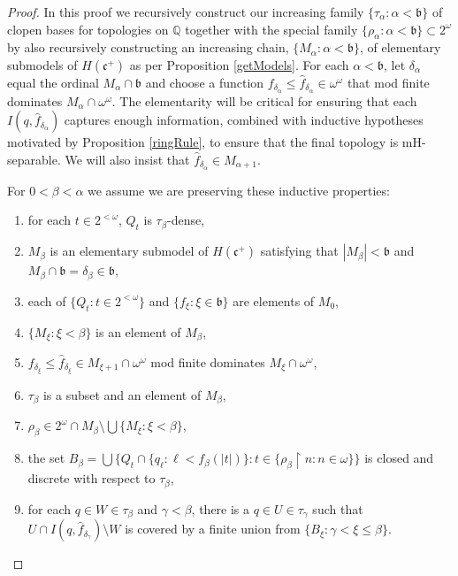 \documentclass{amsart}
\theoremstyle{definition}
\theoremstyle{remark}
\begin{document}
\begin{proof}
In this proof we recursively  construct
our  increasing family $\{ \tau_\alpha : \alpha < \mathfrak b\}$
of clopen bases for topologies on $\mathbb Q$ together with 
the special  family
 $\{ \rho_\alpha : \alpha < \mathfrak b\}
 \subset 2^\omega$ 
 by also recursively constructing an increasing chain,
  $\{ M_\alpha : \alpha < \mathfrak b\}$,
 of elementary
 submodels of $H(\mathfrak c^+)$ as per Proposition \ref{getModels}.
 For each $\alpha <\mathfrak b$,
  let $\delta_\alpha$ equal the ordinal
    $M_\alpha\cap \mathfrak b$ and choose a function $f_{\delta_\alpha}\leq 
    \hat f_{\delta_\alpha}\in
    \omega^\omega$ 
      that mod finite dominates $M_\alpha\cap \omega^\omega$.   
     The elementarity will be
    critical for ensuring that each $I(q, \hat f_{\delta_\alpha})$ 
    captures enough information,
    combined with inductive hypotheses motivated by
    Proposition \ref{ringRule},
    to ensure that the final
    topology is mH-separable. We will also insist that $\hat f_{\delta_\alpha}\in M_{\alpha+1}$.

For $0<\beta  < \alpha$ we assume we are preserving
these inductive properties:
   
\begin{enumerate}
\item for each $t\in 2^{<\omega}$, $Q_t$ is $\tau_{\beta}$-dense,
\item $M_\beta$ is an elementary submodel  of $H(\mathfrak c^+)$
satisfying that $|M_\beta|<\mathfrak b$ and $M_\beta\cap \mathfrak b = 
 \delta_\beta\in \mathfrak b$,
 \item each of $ \{Q_t:t\in 2^{<\omega}\}$ and $\{f_\xi: \xi\in\mathfrak b\}$
  are elements of $M_0$,
\item  $\{ M_\xi : \xi< \beta\}$  is an  element  of $M_\beta$,
\item $f_{\delta_\xi} \leq \hat f_{\delta_\xi}
\in M_{\xi+1}\cap\omega^\omega$  mod finite dominates $M_\xi\cap \omega^\omega$,
\item   $\tau_\beta$ is a subset and an element of $M_{\beta}$,
\item $\rho_\beta\in 2^\omega\cap M_\beta \setminus \bigcup\{M_\xi : \xi<\beta\}$,
 \item the\label{H2} set $B_\beta = \bigcup\{ Q_t \cap \{ q_\ell : \ell < f_\beta(|t|) \}: 
  t\in \{ \rho_\beta\restriction n : n\in \omega\}\}$
is closed and discrete with respect to 
$\tau_{\beta}$,
 \item for\label{wH1} each $q\in W\in \tau_\beta$ and $\gamma<\beta$, there is a $
 q\in U\in \tau_\gamma$
 such that $ U\cap I(q,\hat f_{\delta_\gamma}) \setminus W$ is 
 covered by a finite union from $\{ B_\xi : \gamma < \xi \leq \beta\}$.
\end{enumerate}


\end{proof}
\end{document}
